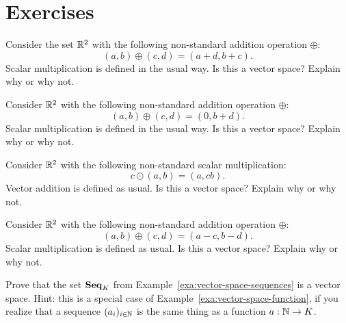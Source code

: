 \section*{Exercises}

\begin{ex}
  Consider the set $\mathbb{R}^2$ with the following non-standard addition
  operation $\oplus$:
  \begin{equation*}
    (a,b) \oplus (c,d) = (a+d,b+c).
  \end{equation*}
  Scalar multiplication is defined in the usual way. Is this a vector space?
  Explain why or why not.
\end{ex}

\begin{ex}
  Consider $\mathbb{R}^2$ with the following non-standard addition operation
  $\oplus$:
  \begin{equation*}
    (a,b) \oplus (c,d) = (0,b+d).
  \end{equation*}
  Scalar multiplication is defined in the usual way. Is this a vector space?
  Explain why or why not.
\end{ex}

\begin{ex}
  Consider $\mathbb{R}^2$ with the following non-standard scalar multiplication:
  \begin{equation*}
    c\odot(a,b) = (a,cb).
  \end{equation*}
  Vector addition is defined as usual. Is this a vector space? Explain
  why or why not.
\end{ex}

\begin{ex}
  Consider $\mathbb{R}^2$ with the following non-standard addition operation
  $\oplus$:
  \begin{equation*}
    (a,b) \oplus (c,d) = (a-c,b-d).
  \end{equation*}
  Scalar multiplication is defined as usual. Is this a vector space?
  Explain why or why not.
\end{ex}

\begin{ex}
  Prove that the set $\mathbf{Seq}_K$ from
  Example~\ref{exa:vector-space-sequences} is a vector space.
  Hint: this is a special case of
  Example~\ref{exa:vector-space-function}, if you realize that a
  sequence $(a_i)_{i\in\mathbb{N}}$ is the same thing as a function $a:\mathbb{N}\to K$.
\end{ex}

